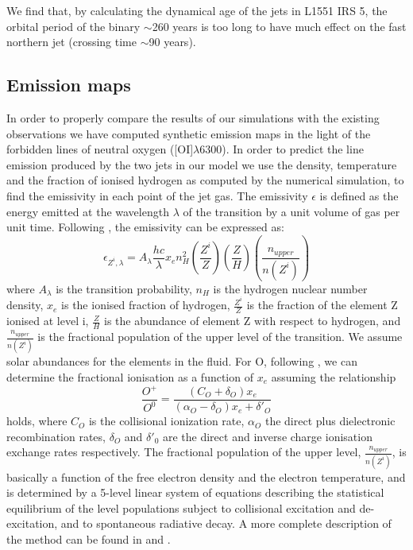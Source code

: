 \documentclass{aa}
\begin{document}
We find that, by calculating the dynamical age of the jets 
in L1551 IRS 5, the orbital period 
of the binary $\sim$260 years is too long to have much effect on the fast 
northern jet (crossing time $\sim$90 years).

\subsection{Emission maps}
In order to properly compare the results of our simulations with 
the existing observations we have computed synthetic emission maps in the 
light of the forbidden lines of neutral oxygen
([OI]$\lambda$6300). In order to predict the 
line emission produced by the two jets in our model 
we use the density, temperature and the fraction
of ionised hydrogen as computed
by the numerical simulation, to find the emissivity 
 in each point of the jet gas. 
The emissivity $\epsilon$ 
is defined as the energy emitted at the wavelength $\lambda$ of 
the transition by a unit volume of gas per unit time.
Following \citet{2002RMxAC..13....8B}, the emissivity 
 can be expressed as:
\begin{equation}
\epsilon_{Z^i, \lambda} = A_{\lambda} \frac{hc}{\lambda} x_e n_H^2 
\left( \frac{Z^i}{Z}\right) 
\left( \frac{Z}{H}\right) 
\left( \frac{n_{upper}}{n(Z^i)} \right)
\end{equation}
where
$A_{\lambda}$ is the transition probability,
$n_H$ is the hydrogen nuclear number density,
$x_e$ is the ionised fraction of hydrogen,
 $ \frac{Z^i}{Z} $ is the fraction of the element Z ionised at level i, 
$\frac{Z}{H}$ is the abundance of element Z with respect to hydrogen, 
and $ \frac{n_{upper}}{n(Z^i)}$ is the fractional population of the upper level
of the transition.
We assume solar abundances for the elements in the fluid.
{
For O,  following \citet{1999A&A...342..717B},
we can determine the fractional ionisation as a function of $x_e$
assuming the relationship 
\begin{equation}
\frac{O^+}{O^0}=\frac{(C_O + \delta_O )x_e}{(\alpha_O - \delta_O) x_e + \delta'_O} 
\end{equation}
holds, where $C_O$ is the collisional ionization rate, $\alpha_O$ the direct plus dielectronic recombination rates, $\delta_O$ and $\delta'_0$ are the direct and inverse charge ionisation exchange rates respectively.}
The fractional population of the upper level, 
$ \frac{n_{upper}}{n(Z^i)}$, is basically a function of {the} free electron density 
and {the} electron temperature, and is determined by a 5-level linear system of 
equations describing the statistical equilibrium of the level populations 
subject to collisional excitation and de-excitation, and to 
spontaneous radiative decay.
A more complete description of the method can be found in
\citet{1995A&A...296..185B, 1999A&A...342..717B} and 
\citet{2002RMxAC..13....8B}.
\end{document}
